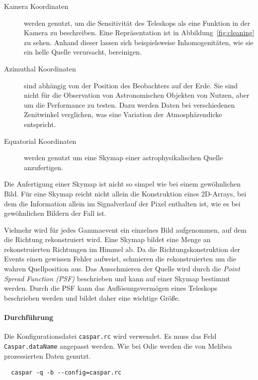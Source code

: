 \begin{description}
	\item[\quad Kamera Koordinaten] werden genutzt, um die Sensitivität des
    Teleskops
		als eine Funktion in der Kamera zu beschreiben.
    Eine Repräsentation ist in Abbildung~\ref{fig:cleaning} zu sehen.
		Anhand dieser lassen sich beispielsweise Inhomogenitäten,
		wie sie ein helle Quelle verursacht, bereinigen.

	\item[\quad Azimuthal Koordinaten] sind abhängig von der Position des
		Beobachters auf der Erde.
		Sie sind nicht für die Observation von Astronomischen Objekten von Nutzen,
		aber um die Performance zu testen.
		Dazu werden Daten bei verschiedenen Zenitwinkel verglichen,
    was eine Variation der Atmosphärendicke entspricht.

	\item[\quad Equatorial Koordinaten] werden genutzt um eine Skymap einer
		astrophysikalischen Quelle anzufertigen.
\end{description}

Die Anfertigung einer Skymap ist nicht so simpel wie bei einem gewöhnlichen
Bild.
Für eine Skymap reicht nicht allein die Konstruktion eines 2D-Arrays,
bei dem die Information allein im Signalverlauf der Pixel enthalten ist,
wie es bei gewöhnlichen Bildern der Fall ist.

Vielmehr wird für jedes Gammaevent ein einzelnes Bild aufgenommen,
auf dem die Richtung rekonstruiert wird.
Eine Skymap bildet eine Menge an rekonstruierten Richtungen im Himmel ab.
Da die Richtungskonstruktion der Events einen gewissen Fehler aufweist,
schmieren die rekonstruierten um die wahren Quellposition aus.
Das Ausschmieren der Quelle wird durch die \textit{Point Spread Function (PSF)}
beschrieben
und kann auf einer Skymap bestimmt werden.
Durch die PSF kann das Auflösungsvermögen eines Teleskops
beschrieben werden und bildet daher eine wichtige Größe.

\paragraph{Durchführung}%

Die Konfigurationsdatei \texttt{caspar.rc} wird verwendet.
Es muss das Feld \texttt{Caspar.dataName} angepasst werden.
Wie bei Odie werden die von Melibea prozessierten Daten genutzt.


\begin{lstlisting}
  caspar -q -b --config=caspar.rc
\end{lstlisting}
